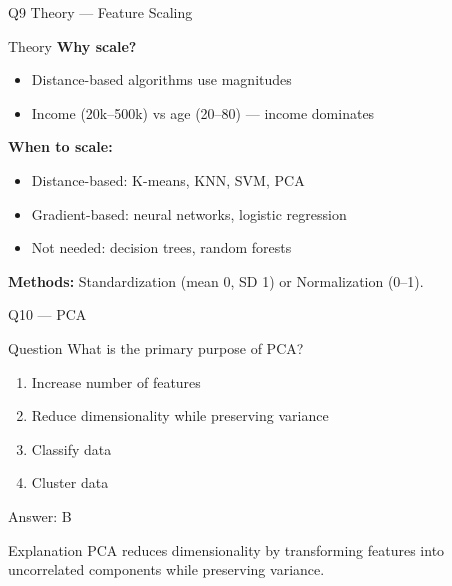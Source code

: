 \documentclass[aspectratio=169,8pt]{beamer}
\begin{document}
	\begin{frame}{Q9 Theory --- Feature Scaling}
		\begin{block}{Theory}
			\textbf{Why scale?}
			\begin{itemize}
				\item Distance-based algorithms use magnitudes
				\item Income (20k--500k) vs age (20--80) --- income dominates
			\end{itemize}
			\textbf{When to scale:}
			\begin{itemize}
				\item Distance-based: K-means, KNN, SVM, PCA
				\item Gradient-based: neural networks, logistic regression
				\item Not needed: decision trees, random forests
			\end{itemize}
			\textbf{Methods:} Standardization (mean 0, SD 1) or Normalization (0--1).
		\end{block}
	\end{frame}
	
	\begin{frame}{Q10 --- PCA}
		\begin{block}{Question}
			What is the primary purpose of PCA?
		\end{block}
		\begin{enumerate}[label=\Alph*.]
			\item Increase number of features
			\item Reduce dimensionality while preserving variance
			\item Classify data
			\item Cluster data
		\end{enumerate}
		\begin{exampleblock}{Answer: B}
		\end{exampleblock}
		\begin{block}{Explanation}
			PCA reduces dimensionality by transforming features into uncorrelated components while preserving variance.
		\end{block}
	\end{frame}
	
\end{document}
